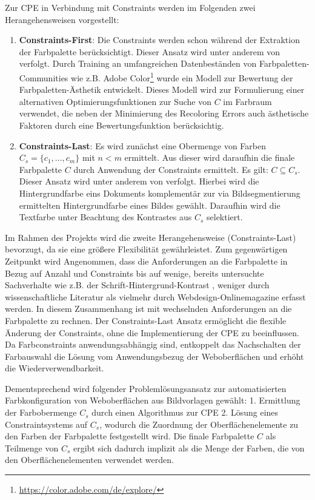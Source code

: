 \documentclass[10pt,a4paper,bibliography=totoc,twocolumn]{scrartcl}
\begin{document}
Zur CPE in Verbindung mit Constraints werden im Folgenden zwei Herangehensweisen vorgestellt:
\begin{enumerate}
    \item \textbf{Constraints-First}: Die Constraints werden schon während der Extraktion der Farbpalette berücksichtigt. Dieser Ansatz wird unter anderem von \citet{colorcomp} verfolgt. Durch Training an umfangreichen Datenbeständen von Farbpaletten-Communities wie z.B. Adobe Color\footnote{\url{https://color.adobe.com/de/explore/}} wurde ein Modell zur Bewertung der Farbpaletten-Ästhetik entwickelt. Dieses Modell wird zur Formulierung einer alternativen Optimierungsfunktionen zur Suche von $C$ im Farbraum verwendet, die neben der Minimierung des Recoloring Errors auch ästhetische Faktoren durch eine Bewertungsfunktion berücksichtig.
    \item \textbf{Constraints-Last}: Es wird zunächst eine Obermenge von Farben $C_s = \{c_1, \ldots , c_m\}$ mit $n < m$ ermittelt. Aus dieser wird daraufhin die finale Farbpalette $C$ durch Anwendung der Constraints ermittelt. Es gilt: $C \subseteq C_s$. Dieser Ansatz wird unter anderem von \citet{documentpalette} verfolgt. Hierbei wird die Hintergrundfarbe eins Dokuments komplementär zur via Bildsegmentierung ermittelten Hintergrundfarbe eines Bildes gewählt. Daraufhin wird die Textfarbe unter Beachtung des Kontrastes aus $C_s$ selektiert.
\end{enumerate}

Im Rahmen des Projekts wird die zweite Herangehensweise (Constraints-Last) bevorzugt, da sie eine größere Flexibilität gewährleistet. Zum gegenwärtigen Zeitpunkt wird Angenommen, dass die Anforderungen an die Farbpalette in Bezug auf Anzahl und Constraints bis auf wenige, bereits untersuchte Sachverhalte wie z.B. der Schrift-Hintergrund-Kontrast \citep{readability}, weniger durch wissenschaftliche Literatur als vielmehr durch Webdesign-Onlinemagazine erfasst werden. In diesem Zusammenhang ist mit wechselnden Anforderungen an die Farbpalette zu rechnen. Der Constraints-Last Ansatz ermöglicht die flexible Änderung der Constraints, ohne die Implementierung der CPE zu beeinflussen. Da Farbconstraints anwendungsabhängig sind, entkoppelt das Nachschalten der Farbauswahl die Lösung vom Anwendungsbezug der Weboberflächen und erhöht die Wiederverwendbarkeit.

Dementsprechend wird folgender Problemlösungsansatz zur automatisierten Farbkonfiguration von Weboberflächen aus Bildvorlagen gewählt: 1. Ermittlung der Farbobermenge $C_s$ durch einen Algorithmus zur CPE 2. Lösung eines Constraintsystems auf $C_s$, wodurch die Zuordnung der Oberflächenelemente zu den Farben der Farbpalette festgestellt wird. Die finale Farbpalette $C$ als Teilmenge von $C_s$ ergibt sich dadurch implizit als die Menge der Farben, die von den Oberflächenelementen verwendet werden.
\end{document}
